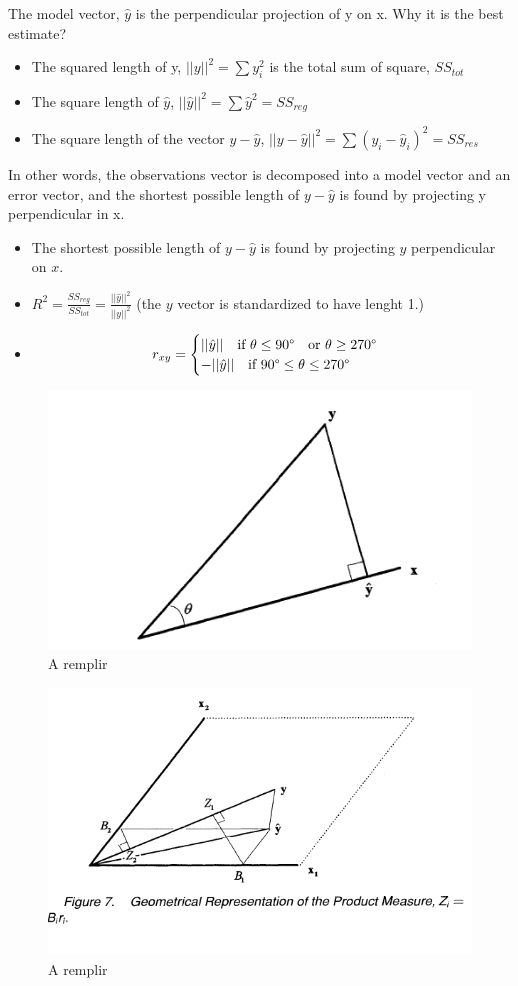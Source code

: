 \documentclass[
]{report}
\providecommand{\tightlist}{%
  \setlength{\itemsep}{0pt}\setlength{\parskip}{0pt}}
\begin{document}
The model vector, \(\hat{y}\) is the perpendicular projection of y on x. Why it is the best estimate?

\begin{itemize}
\tightlist
\item
  The squared length of y, \(||y||^2 = \sum y_i^2\) is the total sum of square, \(SS_{tot}\)
\item
  The square length of \(\hat{y}\), \(||\hat{y}||^2= \sum \hat{y}^2=SS_{reg}\)
\item
  The square length of the vector \(y-\hat{y}\), \(||y - \hat{y}||^2=\sum(y_i-\hat{y}_i)^2 = SS_{res}\)
\end{itemize}

In other words, the observations vector is decomposed into a model vector and an error vector, and the shortest possible length of \(y-\hat{y}\) is found by projecting y perpendicular in x.

\begin{itemize}
\tightlist
\item
  The shortest possible length of \(y - \hat{y}\) is found by projecting \(y\) perpendicular on \(x\).
\item
  \(R^2 = \frac{SS_{reg}}{SS_{tot}}= \frac{||\hat{y}||^2}{||y||^2}\) (the \(y\) vector is standardized to have lenght 1.)
\item
  \[r_{xy} = 
  \begin{cases} ||\hat{y}||  \ \ \ \text{if}  \  \theta \leq 90 \degree \ \ \ \text{or} \ \theta \geq 270 \degree  \\ -||\hat{y}|| \ \ \ \text{if}  \ 90\degree \leq \theta \leq 270\degree
  \end{cases}\]
\end{itemize}

\begin{figure}
    \centering
    \includegraphics[width= 250 pt]{bring1.PNG}
    \caption{A remplir}
\end{figure}

\begin{figure}
    \centering
    \includegraphics[width= 250 pt]{bring.PNG}
    \caption{A remplir}
\end{figure}
\end{document}
